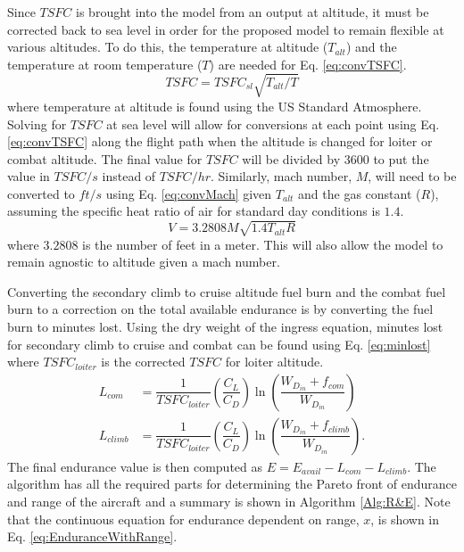 Since $TSFC$ is brought into the model from an output at altitude, it must be corrected back to sea level in order for the proposed model to remain flexible at various altitudes. To do this, the temperature at altitude ($T_{alt}$) and the temperature at room temperature ($T$) are needed for Eq. \ref{eq:convTSFC}.
\begin{equation}
    TSFC = TSFC_{sl}\sqrt{T_{alt}/T}
    \label{eq:convTSFC}
\end{equation}
where temperature at altitude is found using the US Standard Atmosphere.
Solving for $TSFC$ at sea level will allow for conversions at each point  using Eq. \ref{eq:convTSFC} along the flight path when the altitude is changed for loiter or combat altitude. The final value for $TSFC$ will be divided by $3600$ to put the value in $TSFC/s$ instead of $TSFC/hr$. Similarly, mach number, $M$, will need to be converted to $ft/s$ using Eq. \ref{eq:convMach} given $T_{alt}$ and the gas constant ($R$), assuming the specific heat ratio of air for standard day conditions is $1.4$.
\begin{equation}
    V = 3.2808M\sqrt{1.4T_{alt}R}
    \label{eq:convMach}
\end{equation}
where $3.2808$ is the number of feet in a meter. This will also allow the model to remain agnostic to altitude given a mach number.\par
Converting the secondary climb to cruise altitude fuel burn and the combat fuel burn to a correction on the total available endurance is by converting the fuel burn to minutes lost. Using the dry weight of the ingress equation, minutes lost for secondary climb to cruise and combat can be found using Eq. \ref{eq:minlost} where $TSFC_{loiter}$ is the corrected $TSFC$ for loiter altitude.
\begin{equation}
\label{eq:minlost}
\begin{aligned}
    L_{com} &= \dfrac{1}{TSFC_{loiter}}\left(\dfrac{C_L}{C_D}\right)\ln\left(\dfrac{W_{D_{in}}+f_{com}}{W_{D_{in}}}\right)\\
    L_{climb} &=\dfrac{1}{TSFC_{loiter}}\left(\dfrac{C_L}{C_D}\right)\ln\left(\dfrac{W_{D_{in}}+f_{climb}}{W_{D_{in}}}\right).
\end{aligned}
\end{equation}
The final endurance value is then computed as $E = E_{avail}-L_{com}-L_{climb}$. The algorithm has all the required parts for determining the Pareto front of endurance and range of the aircraft and a summary is shown in Algorithm \ref{Alg:R&E}. Note that the continuous equation for endurance dependent on range, $x$, is shown in Eq. \ref{eq:EnduranceWithRange}.
